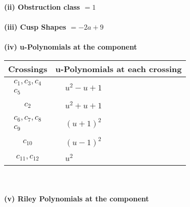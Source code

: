 \documentclass[1p]{elsarticle_modified}
\theoremstyle{definition}
\begin{document}
\flushleft \textbf{(ii) Obstruction class $= 1$}\\~\\
\flushleft \textbf{(iii) Cusp Shapes $= -2 a+9$}\\~\\
\newpage\renewcommand{\arraystretch}{1}
\flushleft \textbf{(iv) u-Polynomials at the component}\newline \\
\begin{tabular}{m{50pt}|m{274pt}}
Crossings & \hspace{64pt}u-Polynomials at each crossing \\
\hline $$\begin{aligned}c_{1},c_{3},c_{4}\\c_{5}\end{aligned}$$&$\begin{aligned}
&u^2- u+1
\end{aligned}$\\
\hline $$\begin{aligned}c_{2}\end{aligned}$$&$\begin{aligned}
&u^2+u+1
\end{aligned}$\\
\hline $$\begin{aligned}c_{6},c_{7},c_{8}\\c_{9}\end{aligned}$$&$\begin{aligned}
&(u+1)^2
\end{aligned}$\\
\hline $$\begin{aligned}c_{10}\end{aligned}$$&$\begin{aligned}
&(u-1)^2
\end{aligned}$\\
\hline $$\begin{aligned}c_{11},c_{12}\end{aligned}$$&$\begin{aligned}
&u^2
\end{aligned}$\\
\hline
\end{tabular}\\~\\
\newpage\renewcommand{\arraystretch}{1}
\flushleft \textbf{(v) Riley Polynomials at the component}\newline \\
\end{document}
